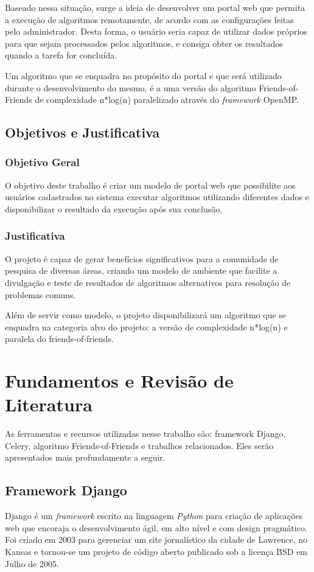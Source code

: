 \documentclass[tg]{mdtufsm}
\begin{document}
Baseado nessa situação, surge a ideia de desenvolver um portal web que permita a execução de algoritmos remotamente, de acordo com as configurações feitas pelo administrador. Desta forma, o usuário seria capaz de utilizar dados próprios para que sejam processados pelos algoritmos, e consiga obter os resultados quando a tarefa for concluída.

Um algoritmo que se enquadra no propósito do portal e que será utilizado durante o desenvolvimento do mesmo, é a uma versão do algoritmo Friends-of-Friends de complexidade n*log(n) paralelizado através do \emph{framework} OpenMP.

\section{Objetivos e Justificativa}

\subsection{Objetivo Geral}

O objetivo deste trabalho é criar um modelo de portal web que possibilite aos usuários cadastrados no sistema executar algoritmos utilizando diferentes dados e disponibilizar o resultado da execução após sua conclusão.

\subsection{Justificativa}

O projeto é capaz de gerar benefícios significativos para a comunidade de pesquisa de diversas áreas, criando um modelo de ambiente que facilite a divulgação e teste de resultados de algoritmos alternativos para resolução de problemas comuns.

Além de servir como modelo, o projeto disponibilizará um algoritmo que se enquadra na categoria alvo do projeto: a versão de complexidade n*log(n) e paralela do friends-of-friends.



\chapter{Fundamentos e Revisão de Literatura}
As ferramentas e recursos utilizadas nesse trabalho são: framework Django, Celery, algoritmo Friends-of-Friends e trabalhos relacionados. Eles serão apresentados mais profundamente a seguir.

\section{Framework Django}
Django\cite{django} é um \emph{framework} escrito na linguagem \emph{Python} para criação de aplicações web que encoraja o desenvolvimento ágil, em alto nível e com design pragmático. Foi criado em 2003 para gerenciar um site jornalístico da cidade de Lawrence, no Kansas e tornou-se um projeto de código aberto publicado sob a licença BSD em Julho de 2005. 
\end{document}
